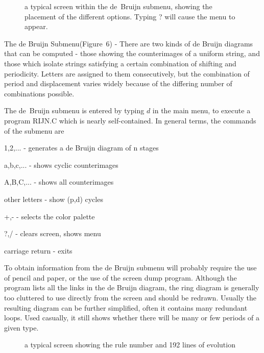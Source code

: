 \begin{list}{}{}
\begin{figure}[htp]
\centering
\fbox{\rule{0mm}{85mm}\rule{124mm}{0mm}} 
\caption{a typical screen within the de~Bruijn submenu, showing the 
placement of the different options. Typing ? will cause the menu to 
appear.} 
\end{figure} 

\item[The de Bruijn Submenu(Figure~6)] - There are two kinds of de 
Bruijn diagrams that can be computed - those showing the counterimages 
of a uniform string, and those which isolate strings satisfying a 
certain combination of shifting and periodicity. Letters are assigned 
to them consecutively, but the combination of period and displacement 
varies widely because of the differing number of combinations possible. 

The de~Bruijn submenu is entered by typing $d$ in the main menu, to 
execute a program RIJN.C which is nearly self-contained. In general 
terms, the commands of the submenu are 

\begin{list}{}{} 
\item[1,2,...] - generates a de Bruijn diagram of n stages
\item[a,b,c,...] - shows cyclic counterimages
\item[A,B,C,...] - shows all counterimages 
\item[other letters] - show (p,d) cycles 
\item[+,-] - selects the color palette 
\item[?,/] - clears screen, shows menu
\item[carriage return] - exits
\end{list} 

To obtain information from the de Bruijn submenu will probably require 
the use of pencil and paper, or the use of the screen dump program. 
Although the program lists all the links in the de Bruijn diagram, the 
ring diagram is generally too cluttered to use directly from the screen 
and should be redrawn. Usually the resulting diagram can be further 
simplified, often it contains many redundant loops. Used casually, it 
still shows whether there will be many or few periods of a given type.
\end{list} 

\begin{figure}[htp]
\centering 
\fbox{\rule{0mm}{110mm}\rule{124mm}{0mm}} 
\caption{a typical screen showing the rule number and 192 lines 
of evolution} 
\end{figure} 

